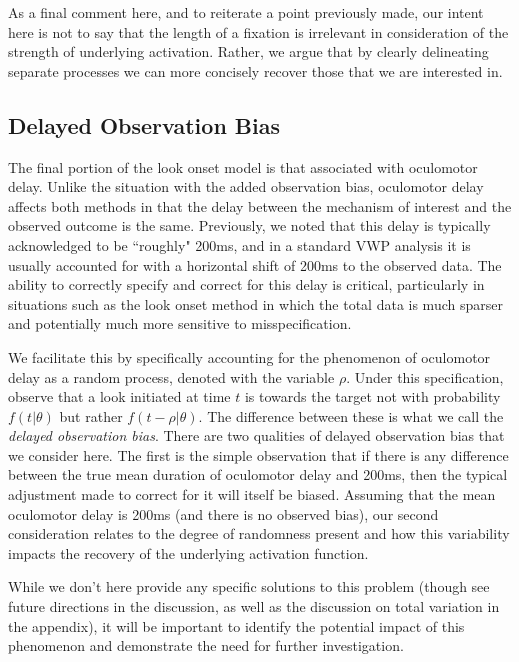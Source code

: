 As a final comment here, and to reiterate a point previously made, our intent here is not to say that the length of a fixation is irrelevant in consideration of the strength of underlying activation. Rather, we argue that by clearly delineating separate processes we can more concisely recover those that we are interested in.  



\subsection{Delayed Observation Bias}


The final portion of the look onset model is that associated with oculomotor delay. Unlike the situation with the added observation bias, oculomotor delay affects both methods in that the delay between the mechanism of interest and the observed outcome is the same. Previously, we noted that this delay is typically acknowledged to be ``roughly" 200ms, and in a standard VWP analysis it is usually accounted for with a horizontal shift of 200ms to the observed data. The ability to correctly specify and correct for this delay is critical, particularly in situations such as the look onset method in which the total data is much sparser and potentially much more sensitive to misspecification. 

We facilitate this by specifically accounting for the phenomenon of oculomotor delay as a random process, denoted with the variable $\rho$. Under this specification, observe that a look initiated at time $t$ is towards the target not with probability $f(t|\theta)$ but rather $f(t - \rho | \theta)$. The difference between these is what we call the \textit{delayed observation bias}. There are two  qualities of delayed observation bias that we consider here. The first is the simple observation that if there is any difference between the true mean duration of oculomotor delay and 200ms, then the typical adjustment made to correct for it will itself be biased. Assuming that the mean oculomotor delay is 200ms (and there is no observed bias), our second consideration relates to the degree of randomness present and how this variability impacts the recovery of the underlying activation function.

While we don't here provide any specific solutions to this problem (though see future directions in the discussion, as well as the discussion on total variation in the appendix), it will be important to identify the potential impact of this phenomenon and demonstrate the need for further investigation.





